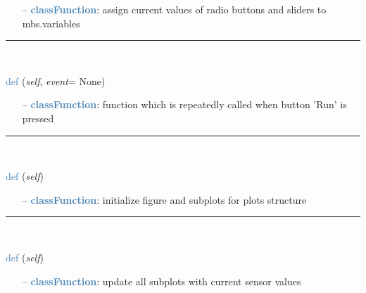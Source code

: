 \begin{itemize}[leftmargin=1.4cm]
\begin{itemize}[leftmargin=0.5cm]
\begin{itemize}[leftmargin=1.4cm]
\begin{itemize}[leftmargin=0.5cm]
\begin{itemize}[leftmargin=1.4cm]
\begin{itemize}[leftmargin=0.5cm]
\begin{itemize}[leftmargin=1.4cm]
\begin{itemize}[leftmargin=1.4cm]
\begin{itemize}[leftmargin=0.7cm]
  \item[--]  \textcolor{steelblue}{\bf classFunction}: assign current values of radio buttons and sliders to mbs.variables\vspace{12pt}\end{itemize}
%
\noindent\rule{8cm}{0.75pt}\vspace{1pt} \\ 
\begin{flushleft}
\noindent \textcolor{steelblue}{def {\bf {}}}\label{sec:interactive:InteractiveDialog:ContinuousRunFunction}
({\it self}, {\it event}= None)
\end{flushleft}
\setlength{\itemindent}{0.7cm}
\begin{itemize}[leftmargin=0.7cm]
  \item[--]  \textcolor{steelblue}{\bf classFunction}: function which is repeatedly called when button 'Run' is pressed\vspace{12pt}\end{itemize}
%
\noindent\rule{8cm}{0.75pt}\vspace{1pt} \\ 
\begin{flushleft}
\noindent \textcolor{steelblue}{def {\bf {}}}\label{sec:interactive:InteractiveDialog:InitializePlots}
({\it self})
\end{flushleft}
\setlength{\itemindent}{0.7cm}
\begin{itemize}[leftmargin=0.7cm]
  \item[--]  \textcolor{steelblue}{\bf classFunction}: initialize figure and subplots for plots structure\vspace{12pt}\end{itemize}
%
\noindent\rule{8cm}{0.75pt}\vspace{1pt} \\ 
\begin{flushleft}
\noindent \textcolor{steelblue}{def {\bf {}}}\label{sec:interactive:InteractiveDialog:UpdatePlots}
({\it self})
\end{flushleft}
\setlength{\itemindent}{0.7cm}
\begin{itemize}[leftmargin=0.7cm]
  \item[--]  \textcolor{steelblue}{\bf classFunction}: update all subplots with current sensor values\vspace{12pt}\end{itemize}

\end{itemize}
\end{itemize}
\end{itemize}
\end{itemize}
\end{itemize}
\end{itemize}
\end{itemize}
\end{itemize}
